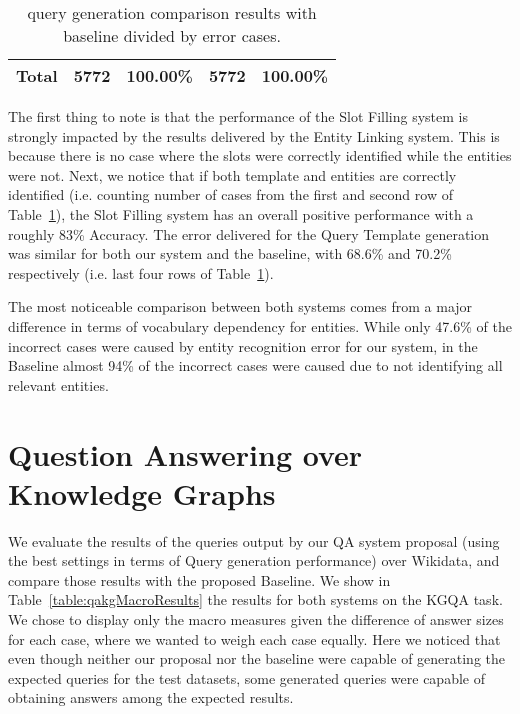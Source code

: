 \begin{table}[h!]
\begin{tabular}{|ccc|cc|cc|}
    \multicolumn{3}{|c|}{\textbf{Total}}                                                                                                                 & 5772                                                                                     & 100.00\%                                                       & 5772                                                                                     & 100.00\%                                                       \\ \hline
    \end{tabular}
    \caption{\SPARQL{} query generation comparison results with baseline divided by error cases.}
    \label{table:queryGenerationErrorRatio}
\end{table}

The first thing to note is that the performance of the Slot Filling system is strongly impacted 
by the results delivered by the Entity Linking system. This is because there is no case where the 
slots were correctly identified while the entities were not. Next, we notice that if both 
template and entities are correctly identified (i.e. counting number of cases from the first and second
row of Table~\ref{table:queryGenerationErrorRatio}), the Slot Filling system has an overall positive 
performance with a roughly 83\% Accuracy. The error delivered for the Query Template generation 
was similar for both our system and the baseline, with 68.6\% and 70.2\% respectively (i.e. last 
four rows of Table~\ref{table:queryGenerationErrorRatio}).

The most noticeable comparison between both systems comes from a major difference in 
terms of vocabulary dependency for entities. While only 47.6\% of the incorrect cases were caused by entity 
recognition error for our system, in the Baseline almost 94\% of the incorrect cases were caused 
due to not identifying all relevant entities.

\section{Question Answering over Knowledge Graphs}
\label{cap5:results/questionAnsweringKG}
We evaluate the results of the \SPARQL{} queries output by our QA system proposal (using the best 
settings in terms of \SPARQL{} Query generation performance) over Wikidata, and compare those results 
with the proposed Baseline. We show in Table~\ref{table:qakgMacroResults} the results for both 
systems on  the KGQA task. We chose to display only the macro measures given the difference of answer 
sizes for each case, where we wanted to weigh each case equally. Here we noticed that even though 
neither our proposal nor the baseline were capable of generating the expected \SPARQL{} queries for 
the test datasets, some generated \SPARQL{} queries were capable of obtaining answers among the 
expected results. 

